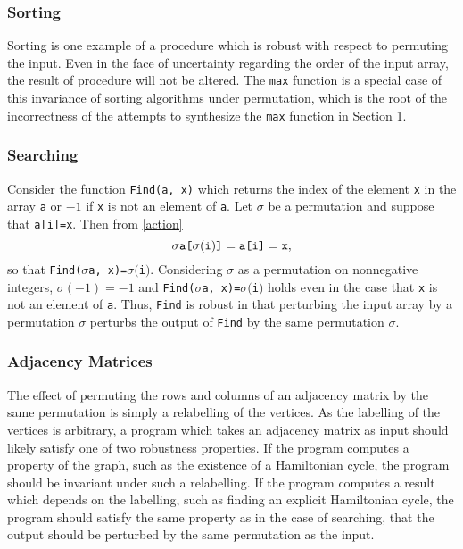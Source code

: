 \documentclass{llncs}
\begin{document}
\subsubsection{Sorting}

Sorting is one example of a procedure which is robust with respect to permuting the input.  Even in the face of uncertainty regarding the order of the input array, the result of procedure will not be altered.  The \verb!max! function is a special case of this invariance of sorting algorithms under permutation, which is the root of the incorrectness of the attempts to synthesize the \verb!max! function in Section 1.

\subsubsection{Searching}

Consider the function \verb!Find(a, x)! which returns the index of the element \verb!x! in the array \verb!a! or \(-1\) if \verb!x! is not an element of \verb!a!.  Let \(\sigma\) be a permutation and suppose that \verb!a[i]=x!.  Then from \eqref{action}
\[\sigma\verb!a[!\sigma(\verb!i!)\verb!]! = \verb!a[i]! = \verb!x!,\]
so that \verb!Find(!\(\sigma\)\verb!a, x)=!\(\sigma(\)\verb!i!\()\).  Considering \(\sigma\) as a permutation on nonnegative integers, \(\sigma(-1) = -1\) and \verb!Find(!\(\sigma\)\verb!a, x)=!\(\sigma(\)\verb!i!\()\) holds even in the case that \verb!x! is not an element of \verb!a!.  Thus, \verb!Find! is robust in that perturbing the input array by a permutation \(\sigma\) perturbs the output of \verb!Find! by the same permutation \(\sigma\).

\subsubsection{Adjacency Matrices}

The effect of permuting the rows and columns of an adjacency matrix by the same permutation is simply a relabelling of the vertices.  As the labelling of the vertices is arbitrary, a program which takes an adjacency matrix as input should likely satisfy one of two robustness properties.  If the program computes a property of the graph, such as the existence of a Hamiltonian cycle, the program should be invariant under such a relabelling.  If the program computes a result which depends on the labelling, such as finding an explicit Hamiltonian cycle, the program should satisfy the same property as in the case of searching, that the output should be perturbed by the same permutation as the input.
\end{document}
